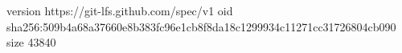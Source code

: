 version https://git-lfs.github.com/spec/v1
oid sha256:509b4a68a37660e8b383fc96e1cb8f8da18c1299934c11271cc31726804cb090
size 43840
